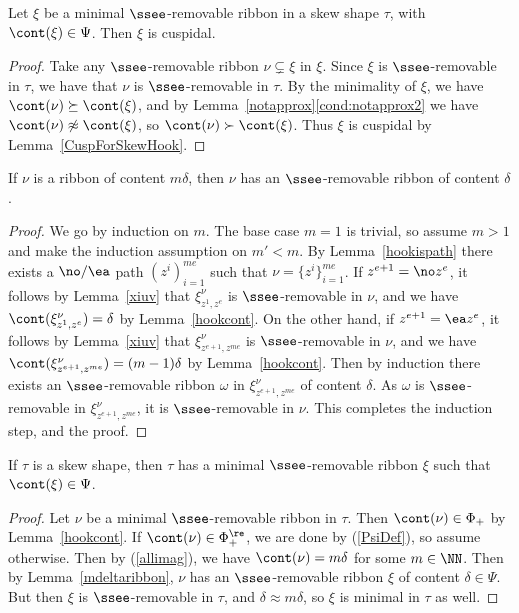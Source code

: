 \begin{lemma}\label{minremiscusp}
Let \(\xi\) be a minimal \(\ssee\)-removable ribbon in a skew shape \(\tau\), with \(\cont(\xi) \in \Psi\). Then \(\xi\) is cuspidal.
\end{lemma}
\begin{proof}
Take any \(\ssee\)-removable ribbon \(\nu \subsetneq \xi\) in \(\xi\). Since \(\xi\) is \(\ssee\)-removable in \(\tau\), we have that \(\nu\) is \(\ssee\)-removable in \(\tau\). By the minimality of \(\xi\), we have \(\cont(\nu) \succeq \cont(\xi)\), and by Lemma~\ref{notapprox}\eqref{cond:notapprox2} we have \(\cont(\nu) \not \approx \cont(\xi)\), so \(\cont(\nu) \succ \cont(\xi)\). Thus \(\xi\) is cuspidal by Lemma~\ref{CuspForSkewHook}.
\end{proof}

\begin{lemma}\label{mdeltaribbon}
If \(\nu\) is a ribbon of content \(m\delta\), then \(\nu\) has an \(\ssee\)-removable ribbon of content \(\delta\).
\end{lemma}
\begin{proof}
We go by induction on \(m\). The base case \(m=1\) is trivial, so assume \(m>1\) and make the induction assumption on \(m' < m\). By Lemma~\ref{hookispath} there exists a \(\no/\ea\) path \((z^i)_{i=1}^{me}\) such that \(\nu = \{z^i\}_{i=1}^{me}\). If \(z^{e+1} = \no z^e\), it follows by Lemma~\ref{xiuv} that \(\xi^\nu_{z^1, z^e}\) is \(\ssee\)-removable in \(\nu\), and we have \(\cont(\xi^\nu_{z^1,z^e}) = \delta\) by Lemma~\ref{hookcont}. On the other hand, if \(z^{e+1} = \ea z^e\), it follows by Lemma~\ref{xiuv} that \(\xi^\nu_{z^{e+1}, z^{me}}\) is \(\ssee\)-removable in \(\nu\), and we have \(\cont(\xi^\nu_{z^{e+1}, z^{me}}) = (m-1)\delta\) by Lemma~\ref{hookcont}. Then by induction there exists an \(\ssee\)-removable ribbon \(\omega\) in \(\xi^\nu_{z^{e+1}, z^{me}}\) of content \(\delta\). As \(\omega\) is \(\ssee\)-removable in \(\xi^\nu_{z^{e+1}, z^{me}}\), it is \(\ssee\)-removable in \(\nu\). This completes the induction step, and the proof.
\end{proof}


\begin{lemma}\label{minremexist}
If \(\tau\) is a skew shape, then \(\tau\) has a minimal \(\ssee\)-removable ribbon \(\xi\) such that \(\cont(\xi) \in \Psi\).
\end{lemma}
\begin{proof}
Let \(\nu\) be a minimal \(\ssee\)-removable ribbon in \(\tau\). Then \(\cont(\nu) \in \Phi_+\) by Lemma~\ref{hookcont}. If \(\cont(\nu) \in \Phi_+^\re\), we are done by (\ref{PsiDef}), so assume otherwise. Then 
by (\ref{allimag}), we have \(\cont(\nu) = m\delta\) for some \(m\in \NN\).
Then by Lemma~\ref{mdeltaribbon}, \(\nu\) has an \(\ssee\)-removable ribbon \(\xi\) of content \(\delta \in \Psi\). But then \(\xi\) is \(\ssee\)-removable in \(\tau\), and \(\delta \approx m\delta\), so \(\xi\) is minimal in \(\tau\) as well.
\end{proof}

